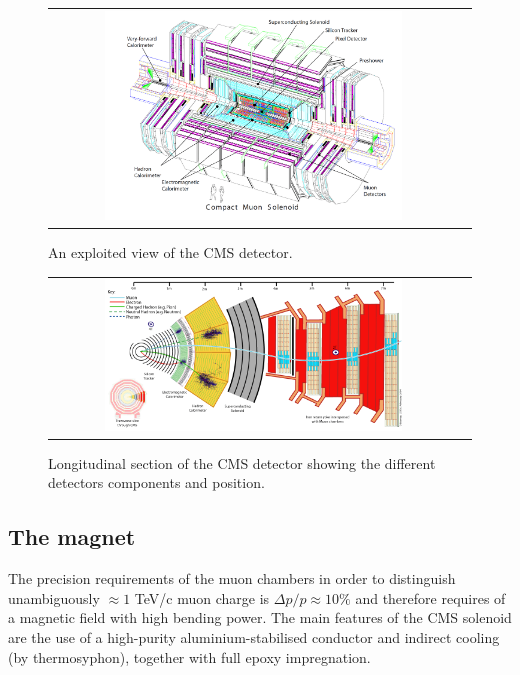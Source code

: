\begin{figure}[tbh!]
	\centering
	\begin{tabular}{cc}
		\includegraphics[width=0.75\textwidth]{detector/pics/CMS_apparatus.png}
	\end{tabular}
	\caption{An exploited view of the CMS detector.}
	\label{fig:CMS_apparatus}
\end{figure}

\begin{figure}[tbh!]
	\centering
	\begin{tabular}{cc}
		\includegraphics[width=0.75\textwidth]{detector/pics/CMS_slice.png}
	\end{tabular}
	\caption{Longitudinal section of the CMS detector showing the different detectors components and position.}
	\label{fig:CMS_slice}
\end{figure}

\clearpage

\subsection{The magnet}

The precision requirements of the muon chambers in order to distinguish unambiguously $\approx 1$ TeV/c muon charge is $\Delta p / p \approx 10\%$ and therefore requires of a magnetic field with high bending power. The main features of the CMS solenoid are the use of a high-purity aluminium-stabilised conductor and indirect cooling (by thermosyphon), together with full epoxy impregnation.

